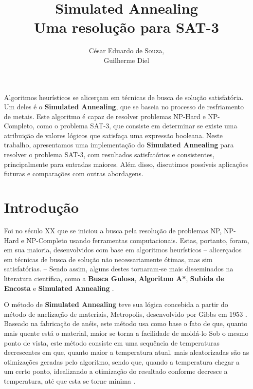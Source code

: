 \documentclass[12pt]{article}
\title{Simulated Annealing\\ Uma resolução para SAT-3}
\author{César Eduardo de Souza\inst{1},\\ Guilherme Diel\inst{1}}
\begin{document}
 

\maketitle

     
\begin{resumo} 
  Algoritmos heurísticos se alicerçam em técnicas de busca de solução satisfatória. Um deles é o \textbf{Simulated Annealing}, que se baseia no processo de resfriamento de metais. Este algoritmo é capaz de resolver problemas NP-Hard e NP-Completo, como o problema SAT-3, que consiste em determinar se existe uma atribuição de valores lógicos que satisfaça uma expressão booleana. Neste trabalho, apresentamos uma implementação do \textbf{Simulated Annealing} para resolver o problema SAT-3, com resultados satisfatórios e consistentes, principalmente para entradas maiores. Além disso, discutimos possíveis aplicações futuras e comparações com outras abordagens.
\end{resumo}


\section{Introdução}
\label{sec:introducao}

Foi no século XX que se iniciou a busca pela resolução de problemas NP, NP-Hard e NP-Completo usando ferramentas computacionais. 
%
Estas, portanto, foram, em sua maioria, desenvolvidos com base em algoritmos heurísticos – alicerçados em técnicas de busca de solução não necessariamente ótimas, mas sim satisfatórias. – 
%
Sendo assim, alguns destes tornaram-se mais disseminados na literatura científica, como a \textbf{Busca Gulosa}, \textbf{Algoritmo A*}, \textbf{Subida de Encosta} e \textbf{Simulated Annealing} \cite{kokashHeuristicIntro}. 

O método de \textbf{Simulated Annealing} teve sua lógica concebida a partir do método de anelização de materiais, Metropolis, desenvolvido por Gibbs em 1953 \cite{metropolis1953equation}.
%
Baseado na fabricação de anéis, este método usa como base o fato de que, quanto mais quente está o material, maior se torna a facilidade de moldá-lo%
Sob o mesmo ponto de vista, este método consiste em uma sequência de temperaturas decrescentes em que, quanto maior a temperatura atual, mais aleatorizadas são as otimizações geradas pelo algoritmo, sendo que, quando a temperatura chegar a um certo ponto, idealizando a otimização do resultado conforme decresce a temperatura, até que esta se torne mínima \cite{bertsimas1993simulated}.
\end{document}

